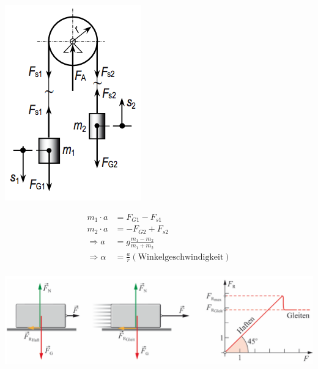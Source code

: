 \begin{minipage}[h!]{0.2\linewidth}
	\includegraphics[width=0.9\linewidth]{images/kraefte_gleichgewicht}
\end{minipage}
\hfill
\begin{minipage}[h!]{0.4\linewidth}
\begin{align*}
m_1 \cdot a & = F_{G1} - F_{s1} \\
m_2 \cdot a & = -F_{G2} + F_{s2} \\
\Rightarrow a&=g\frac{m_1-m_2}{m_1+m_2}  \\
\Rightarrow \alpha &= \frac{a}{r} (\text{Winkelgeschwindigkeit})\\
\end{align*}
\end{minipage}

\includegraphics[width=0.9\linewidth]{images/haft_gleitkraft}


